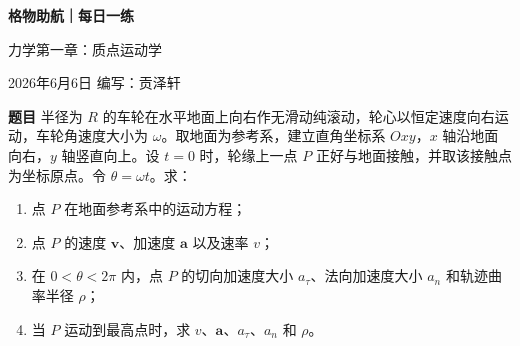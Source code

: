 \documentclass[11pt,a4paper]{ctexart}
\begin{document}
\begin{center}
  {\Large\bfseries\color{mainblue} 格物助航｜每日一练}\par
  \vspace{0.25em}
  {\large 力学第一章：质点运动学}\par
  \vspace{0.35em}
  {\small 2026年6月6日}
  \vspace{0.35em}
  {\small 编写：贡泽轩}
\end{center}

\vspace{-0.3em}

\begin{problemBox}
\noindent\textbf{题目}\quad
半径为 $R$ 的车轮在水平地面上向右作无滑动纯滚动，轮心以恒定速度向右运动，车轮角速度大小为 $\omega$。取地面为参考系，建立直角坐标系 $Oxy$，$x$ 轴沿地面向右，$y$ 轴竖直向上。设 $t=0$ 时，轮缘上一点 $P$ 正好与地面接触，并取该接触点为坐标原点。令 $\theta=\omega t$。求：
\begin{enumerate}
  \item 点 $P$ 在地面参考系中的运动方程；
  \item 点 $P$ 的速度 $\bm v$、加速度 $\bm a$ 以及速率 $v$；
  \item 在 $0<\theta<2\pi$ 内，点 $P$ 的切向加速度大小 $a_\tau$、法向加速度大小 $a_n$ 和轨迹曲率半径 $\rho$；
  \item 当 $P$ 运动到最高点时，求 $v$、$\bm a$、$a_\tau$、$a_n$ 和 $\rho$。
\end{enumerate}
\end{problemBox}
\end{document}

